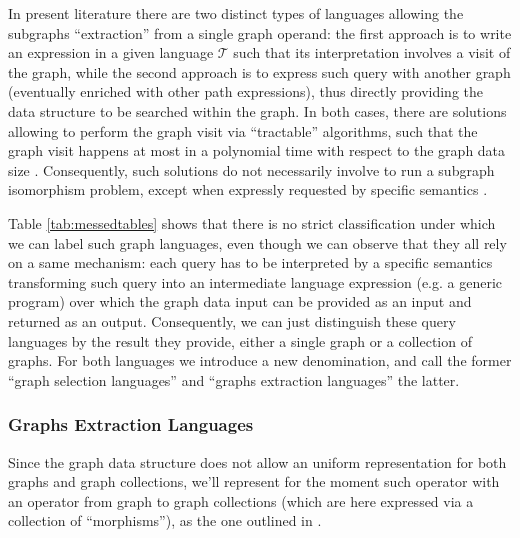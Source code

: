 In present literature there are two distinct types of languages allowing the subgraphs ``extraction'' from a single graph operand:  the first approach is to write an expression in a given language $\mathcal{T}$ such that its interpretation involves a visit of the graph, while the second approach is to express such query with another graph (eventually enriched with other path expressions), thus directly providing the data structure to be searched within the graph. In both cases, there are solutions allowing to perform the graph visit via ``tractable'' algorithms, such that the graph visit happens at most in a polynomial time with respect to the graph data size \cite{n3,NautiLOD,Barcelo2013}. Consequently, such solutions do not necessarily involve to run a subgraph isomorphism  problem, except when expressly requested by specific semantics \cite{JunghannsKAPR17}.

Table \vref{tab:messedtables} shows that there is no strict classification under which we can label such graph languages, even though we can observe that they all rely on a same mechanism: each query has to be interpreted by a specific semantics transforming such query into an intermediate language expression (e.g. a generic program) over which the graph data input can be provided as an input and returned as an output. Consequently, we can just distinguish these query languages by the result they provide, either a single graph or a collection of graphs. For both languages we introduce a new denomination, and call the former ``graph selection languages'' and ``graphs extraction languages'' the latter. 

\subsubsection{Graphs Extraction Languages}\label{subsec:gpm}

Since the graph data structure does not allow an uniform representation for both graphs and graph collections, we'll represent for the moment such operator with an operator from graph to graph collections (which are here expressed  via a collection of ``morphisms''), as the one outlined in \cite{JunghannsKAPR17}.

